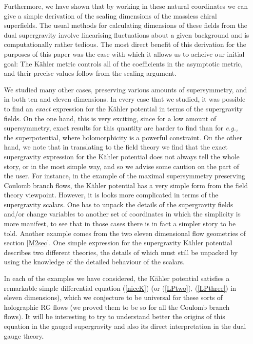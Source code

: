 \documentclass[a4paper,12pt]{article}
\providecommand{\reef}[1]{(\ref{#1})}
\begin{document}
Furthermore, we have shown that by working in these natural coordinates
we can give a simple derivation of the scaling dimensions of the
massless chiral superfields. The usual methods for calculating
dimensions of these fields from the dual supergravity involve
linearising fluctuations about a given background and is
computationally rather tedious. The most direct benefit of this
derivation for the purposes of this paper was the ease with which it
allows us to acheive our initial goal: The K\"ahler metric controls
all of the coefficients in the asymptotic metric, and their precise
values follow from the scaling argument.

We studied many other cases, preserving various amounts of
supersymmetry, and in both ten and eleven dimensions. In every case
that we studied, it was possible to find an {\it exact} expression for
the K\"ahler potential in terms of the supergravity fields. On the
one hand, this is very exciting, since for a low amount of
supersymmetry, exact results for this quantity are harder to find than
for {\it e.g.,} the superpotential, where holomorphicity is a powerful
constraint.  On the other hand, we note that in translating to the
field theory we find that the exact supergravity expression for the
K\"ahler potential does not always tell the whole story, or in the
most simple way, and so we advise some caution on the part of the
user.  For instance, in the example of the maximal supersymmetry
preserving Coulomb branch flows, the K\"ahler potential has a very
simple form from the field theory viewpoint.  However, it is looks
more complicated in terms of the supergravity scalars. One has to
unpack the details of the supergravity fields and/or change variables
to another set of coordinates in which the simplicity is more
manifest\cite{bakas,bakas2,beh,kraus}, to see that in those cases
there is in fact a simpler story to be told.  Another example comes
from the two eleven dimensional flow geometries of section
\ref{M2sec}.  One simple expression for the supergravity K\"ahler
potential describes two different theories, the details of which must
still be unpacked by using the knowledge of the detailed behaviour of
the scalars.

In each of the examples we have considered, the K\"ahler potential
satisfies a remarkable simple differential equation \reef{niceK} (or
\reef{LPtwo}, \reef{LPthree} in eleven dimensions), which we
conjecture to be universal for these sorts of holographic RG flows (we
proved them to be so for all the Coulomb branch flows).  It will be
interesting to try to understand better the origins of this equation
in the gauged supergravity and also its direct interpretation in the
dual gauge theory.
\end{document}
